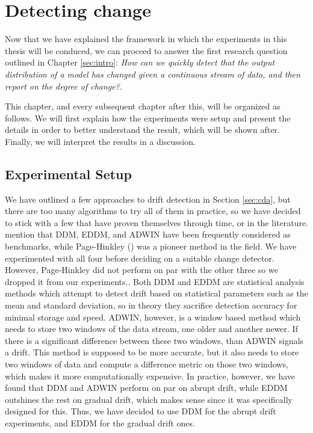 \documentclass[12pt]{extreport}
\begin{document}
\chapter{Detecting change} \label{sec:detecting}

Now that we have explained the framework in which the experiments in this thesis will be conduced, we can proceed to answer the first research question outlined in Chapter \ref{sec:intro}: \emph{How can we quickly detect that the output distribution of a model has changed given a continuous stream of data, and then report on the degree of change?}.

This chapter, and every subsequent chapter after this, will be organized as follows. We will first explain how the experiments were setup and present the details in order to better understand the result, which will be shown after. Finally, we will interpret the results in a discussion.

\section{Experimental Setup}

We have outlined a few approaches to drift detection in Section \ref{sec:cda}, but there are too many algorithms to try all of them in practice, so we have decided to stick with a few that have proven themselves through time, or in the literature. \cite{mcdiarmid} mention that DDM, EDDM, and ADWIN have been frequently considered as benchmarks, while Page-Hinkley (\cite{pagehinkley}) was a pioneer method in the field. We have experimented with all four before deciding on a suitable change detector. However, Page-Hinkley did not perform on par with the other three so we dropped it from our experiments.. Both DDM and EDDM are statistical analysis methods which attempt to detect drift based on statistical parameters such as the mean and standard deviation, so in theory they sacrifice detection accuracy for minimal storage and speed. ADWIN, however, is a window based method which needs to store two windows of the data stream, one older and another newer. If there is a significant difference between these two windows, than ADWIN signals a drift. This method is supposed to be more accurate, but it also needs to store two windows of data and compute a difference metric on those two windows, which makes it more computationally expensive. In practice, however, we have found that DDM and ADWIN perform on par on abrupt drift, while EDDM outshines the rest on gradual drift, which makes sense since it was specifically designed for this. Thus, we have decided to use DDM for the abrupt drift experiments, and EDDM for the gradual drift ones.
\end{document}
